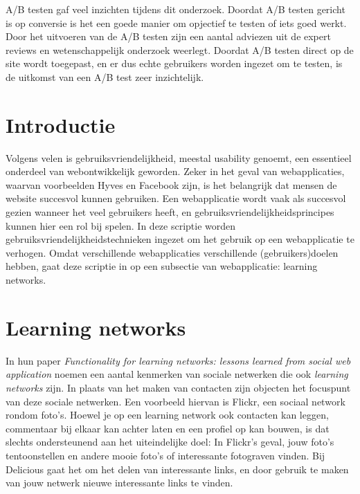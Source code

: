 \documentclass[a4paper, 10pt, pdftex]{report}
\begin{document}
    A/B testen gaf veel inzichten tijdens dit onderzoek. Doordat A/B testen gericht is op conversie is het een goede manier om opjectief te testen of iets goed werkt. Door het uitvoeren van de A/B testen zijn een aantal adviezen uit de expert reviews en wetenschappelijk onderzoek weerlegt. Doordat A/B testen direct op de site wordt toegepast, en er dus echte gebruikers worden ingezet om te testen, is de uitkomst van een A/B test zeer inzichtelijk.

  \newpage
  \setcounter{tocdepth}{1}
  \tableofcontents

  \newpage
  \section*{Introductie}
    Volgens velen is gebruiksvriendelijkheid, meestal usability genoemt, een essentieel onderdeel van webontwikkelijk geworden. Zeker in het geval van webapplicaties, waarvan voorbeelden Hyves en Facebook zijn, is het belangrijk dat mensen de website succesvol kunnen gebruiken. Een webapplicatie wordt vaak als succesvol gezien wanneer het veel gebruikers heeft, en gebruiksvriendelijkheidsprincipes kunnen hier een rol bij spelen. In deze scriptie worden gebruiksvriendelijkheidstechnieken ingezet om het gebruik op een webapplicatie te verhogen. Omdat verschillende webapplicaties verschillende (gebruikers)doelen hebben, gaat deze scriptie in op een subsectie van webapplicatie: learning networks.

    \section{Learning networks}
            In hun paper \emph{Functionality for learning networks: lessons learned from social web application} noemen \citeauthor{Berlanga2007} een aantal kenmerken van sociale netwerken die ook \emph{learning networks} zijn. In plaats van het maken van contacten zijn objecten het focuspunt van deze sociale netwerken. Een voorbeeld hiervan is Flickr, een sociaal network rondom foto's. Hoewel je op een learning network ook contacten kan leggen, commentaar bij elkaar kan achter laten en een profiel op kan bouwen, is dat slechts ondersteunend aan het uiteindelijke doel: In Flickr's geval, jouw foto's tentoonstellen en andere mooie foto's of interessante fotograven vinden. Bij Delicious gaat het om het delen van interessante links, en door gebruik te maken van jouw netwerk nieuwe interessante links te vinden.
\end{document}
